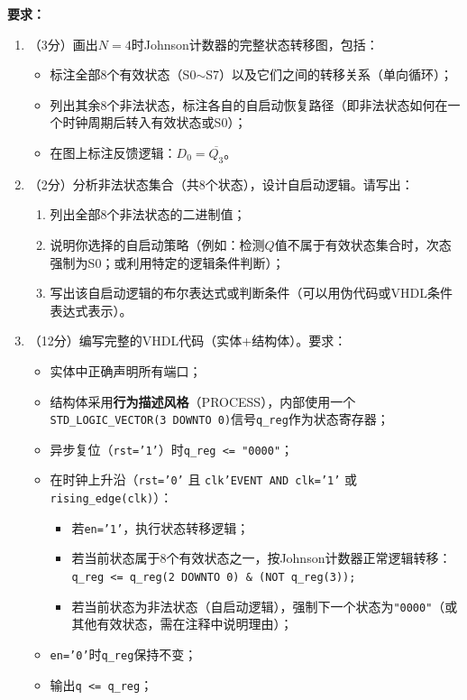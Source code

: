 \textbf{要求：}
\begin{enumerate}[label=(\arabic*)]
  \item （3分）画出$N=4$时Johnson计数器的完整状态转移图，包括：
  \begin{itemize}
    \item 标注全部8个有效状态（S0$\sim$S7）以及它们之间的转移关系（单向循环）；
    \item 列出其余8个非法状态，标注各自的自启动恢复路径（即非法状态如何在一个时钟周期后转入有效状态或S0）；
    \item 在图上标注反馈逻辑：$D_0 = \overline{Q_3}$。
  \end{itemize}
  \item （2分）分析非法状态集合（共8个状态），设计自启动逻辑。请写出：
  \begin{enumerate}
    \item 列出全部8个非法状态的二进制值；
    \item 说明你选择的自启动策略（例如：检测$Q$值不属于有效状态集合时，次态强制为S0；或利用特定的逻辑条件判断）；
    \item 写出该自启动逻辑的布尔表达式或判断条件（可以用伪代码或VHDL条件表达式表示）。
  \end{enumerate}
  \item （12分）编写完整的VHDL代码（实体+结构体）。要求：
  \begin{itemize}
    \item 实体中正确声明所有端口；
    \item 结构体采用\textbf{行为描述风格}（PROCESS），内部使用一个\texttt{STD\_LOGIC\_VECTOR(3~DOWNTO~0)}信号\texttt{q\_reg}作为状态寄存器；
    \item 异步复位（\texttt{rst='1'}）时\texttt{q\_reg <= "0000"}；
    \item 在时钟上升沿（\texttt{rst='0'} 且 \texttt{clk'EVENT AND clk='1'} 或 \texttt{rising\_edge(clk)}）：
    \begin{itemize}
      \item 若\texttt{en='1'}，执行状态转移逻辑；
      \item 若当前状态属于8个有效状态之一，按Johnson计数器正常逻辑转移：\texttt{q\_reg <= q\_reg(2 DOWNTO 0) \& (NOT q\_reg(3));}
      \item 若当前状态为非法状态（自启动逻辑），强制下一个状态为\texttt{"0000"}（或其他有效状态，需在注释中说明理由）；
    \end{itemize}
    \item \texttt{en='0'}时\texttt{q\_reg}保持不变；
    \item 输出\texttt{q <= q\_reg}；

\end{itemize}
\end{enumerate}
